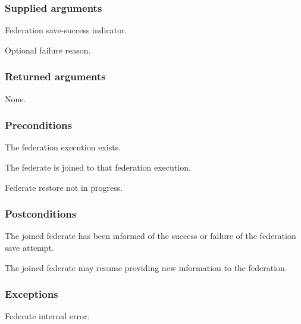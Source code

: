 \subsubsection{Supplied arguments}

\begin{stdalphalist}
    \item Federation save-success indicator.
    \item Optional failure reason.
\end{stdalphalist}

\subsubsection{Returned arguments}

\begin{stdalphalist}
    \item None.
\end{stdalphalist}

\subsubsection{Preconditions}

\begin{stdalphalist}
    \item The federation execution exists.
    \item The federate is joined to that federation execution.
    \item Federate restore not in progress.
\end{stdalphalist}

\subsubsection{Postconditions}

\begin{stdalphalist}
    \item The joined federate has been informed of the success or failure of the federation save attempt.
    \item The joined federate may resume providing new information to the federation.
\end{stdalphalist}

\subsubsection{Exceptions}

\begin{stdalphalist}
    \item Federate internal error.
\end{stdalphalist}

